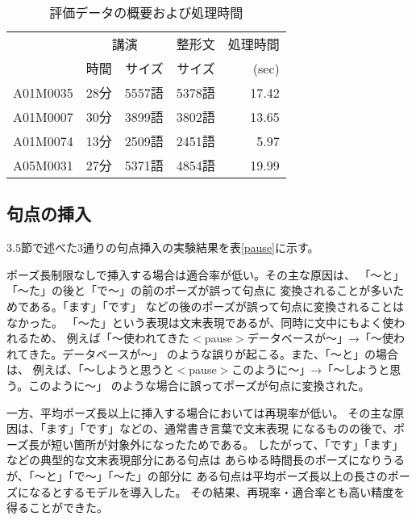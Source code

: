 \begin{table}[t]
\small
\centering
\caption{評価データの概要および処理時間}\label{kouen}
\begin{tabular}{|r||r|r|r|r|} \hline
&\multicolumn{2}{c|}{講演}&整形文&処理時間 \\ \cline{2-4}
&\multicolumn{1}{c|}{時間}&サイズ&サイズ& (sec)\\ \hline \hline
 A01M0035		  &28分    &5557語 &5378語 &17.42\\ \hline
 A01M0007		  &30分    &3899語 &3802語 &13.65\\ \hline
 A01M0074		  &13分    &2509語 &2451語 &5.97\\ \hline
 A05M0031	 	  &27分    &5371語 &4854語 &19.99\\ \hline
\end{tabular}
\vspace{-4.0mm}
\end{table}

\subsection{句点の挿入}

3.5節で述べた3通りの句点挿入の実験結果を表\ref{pause}に示す。

ポーズ長制限なしで挿入する場合は適合率が低い。その主な原因は、
「〜と」「〜た」の後と「で〜」の前のポーズが誤って句点に
変換されることが多いためである。「ます」「です」
などの後のポーズが誤って句点に変換されることはなかった。
「〜た」という表現は文末表現であるが、同時に文中にもよく使われるため、
例えば「〜使われてきた$<$pause$>$データベースが〜」→「〜使われてきた。データベースが〜」
のような誤りが起こる。また、「〜と」の場合は、
例えば、「〜しようと思うと$<$pause$>$このように〜」→「〜しようと思う。このように〜」
のような場合に誤ってポーズが句点に変換された。

一方、平均ポーズ長以上に挿入する場合においては再現率が低い。
その主な原因は、「ます」「です」などの、通常書き言葉で文末表現
になるものの後で、ポーズ長が短い箇所が対象外になったためである。
したがって、「です」「ます」などの典型的な文末表現部分にある句点は
あらゆる時間長のポーズになりうるが、「〜と」「で〜」「〜た」の部分に
ある句点は平均ポーズ長以上の長さのポーズになるとするモデルを導入した。
その結果、再現率・適合率とも高い精度を得ることができた。


